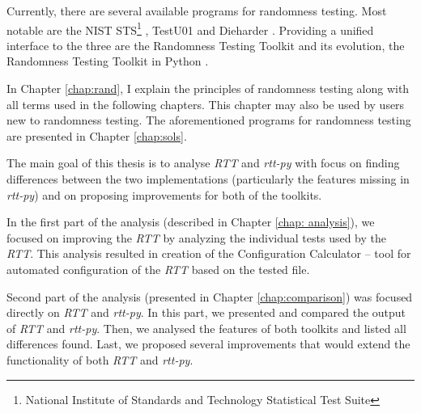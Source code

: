 \documentclass[
  digital,     %
  oneside,     %
  nosansbold,  %
  nocolorbold, %
  nolof,         %
  nolot,         %
]{fithesis4}
\begin{document}
Currently, there are several available programs for randomness testing. Most notable are the NIST STS\footnote{National Institute of Standards and Technology Statistical Test Suite} \cite{nist_site}, TestU01 \cite{tu01_site} and Dieharder \cite{dieharder_orig}. Providing a unified interface to the three are the Randomness Testing Toolkit \cite{rtt-site} and its evolution, the Randomness Testing Toolkit in Python \cite{rtt-py-site}.


In Chapter \ref{chap:rand}, I explain the principles of randomness testing along with all terms used in the following chapters. This chapter may also be used by users new to randomness testing. The aforementioned programs for randomness testing are presented in Chapter \ref{chap:sols}.

The main goal of this thesis is to analyse \emph{RTT} and \emph{rtt-py} with focus on finding differences between the two implementations (particularly the features missing in \emph{rtt-py}) and on proposing improvements for both of the toolkits. 

In the first part of the analysis (described in Chapter \ref{chap: analysis}), we focused on improving the \emph{RTT} by analyzing the individual tests used by the \emph{RTT}. This analysis resulted in creation of the Configuration Calculator -- tool for automated configuration of the \emph{RTT} based on the tested file.

Second part of the analysis (presented in Chapter \ref{chap:comparison}) was focused directly on \emph{RTT} and \emph{rtt-py}. In this part, we presented and compared the output of \emph{RTT} and \emph{rtt-py}. Then, we analysed the features of both toolkits and listed all differences found. Last, we proposed several improvements that would extend the functionality of both \emph{RTT} and \emph{rtt-py}.

\end{document}
